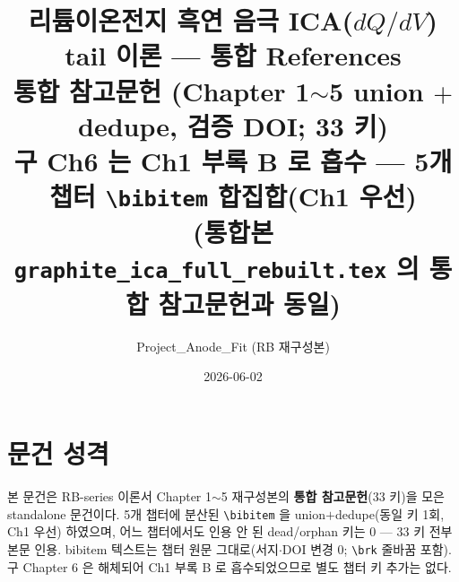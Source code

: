 \documentclass[11pt,a4paper]{article}
\title{\textbf{리튬이온전지 흑연 음극 ICA($dQ/dV$) tail 이론 — 통합 References}\\[0.5em]
\large 통합 참고문헌 (Chapter 1$\sim$5 union $+$ dedupe, 검증 DOI; 33 키)\\[0.2em]
\normalsize 구 Ch6 는 Ch1 부록 B 로 흡수 — 5개 챕터 \texttt{\textbackslash bibitem} 합집합(Ch1 우선)\\
(통합본 \texttt{graphite\_ica\_full\_rebuilt.tex} 의 통합 참고문헌과 동일)}
\author{Project\_Anode\_Fit (RB 재구성본)}
\date{2026-06-02}
\begin{document}
\sloppy
\maketitle

\section*{문건 성격}
본 문건은 RB-series 이론서 Chapter 1$\sim$5 재구성본의 \textbf{통합 참고문헌}(33 키)을 모은 standalone
문건이다. 5개 챕터에 분산된 \texttt{\textbackslash bibitem} 을 union$+$dedupe(동일 키 1회, Ch1 우선)
하였으며, 어느 챕터에서도 인용 안 된 dead/orphan 키는 0 — 33 키 전부 본문 인용. bibitem 텍스트는 챕터
원문 그대로(서지$\cdot$DOI 변경 0; \texttt{\textbackslash brk} 줄바꿈 포함). 구 Chapter 6 은 해체되어
Ch1 부록 B 로 흡수되었으므로 별도 챕터 키 추가는 없다.

\tableofcontents
\newpage
\end{document}
